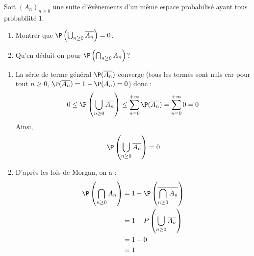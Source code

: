 \documentclass[a4paper,10pt]{report}
\begin{document}
\begin{Exercice}{} Soit $(A_n)_{n \geq 0}$ une suite d'évènements d'un même espace probabilisé ayant tous probabilité 1. 
 
 \begin{enumerate}
 \item Montrer que $\P \left( \bigcup_{n \geq 0} \overline{A_n} \right) = 0$.
 \item Qu'en déduit-on pour $\P \left( \bigcap_{n \geq 0} A_n \right)$?
 \end{enumerate}
 \end{Exercice}
 
 \corr 
 
 \begin{enumerate}
 \item La série de terme général $\P( \overline{A_n})$ converge (tous les termes sont nuls car pour tout $n \geq 0$, $\P( \overline{A_n})= 1- \P(A_n)=0$) donc :
 $$ 0 \leq \P \left( \bigcup_{n \geq 0} \overline{A_n} \right) \leq \sum_{n=0}^{+ \infty} \P( \overline{A_n})  = \sum_{n=0}^{+ \infty} 0 = 0$$
 Ainsi,
 $$ \P \left( \bigcup_{n \geq 0} \overline{A_n} \right)=0$$
 \item D'après les lois de Morgan, on a :
 \begin{align*}
 \P \left( \bigcap_{n \geq 0} A_n \right) & = 1 - \P \left( \overline{\bigcap_{n \geq 0} A_n} \right) \\
 &= 1 - P \left( \bigcup_{n \geq 0} \overline{A_n} \right) \\
 & =1-0 \\
 & = 1
 \end{align*}
 \end{enumerate}
\end{document}
